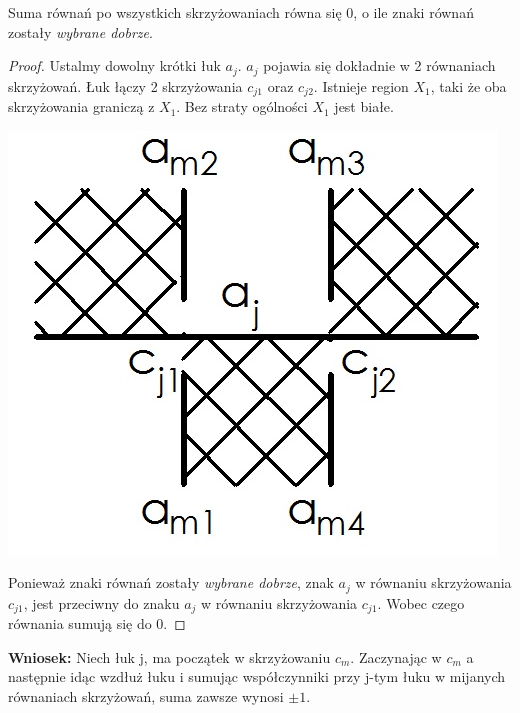 \begin{lemat}
Suma równań po wszystkich skrzyżowaniach równa się 0, o ile znaki równań zostały \emph{wybrane dobrze}.
\end{lemat}
\begin{proof}
Ustalmy dowolny krótki łuk $a_{j}$. $a_{j}$ pojawia się dokładnie w 2 równaniach skrzyżowań. Łuk łączy 2 skrzyżowania $c_{j1}$ oraz $c_{j2}$. Istnieje region $X_{1}$, taki że oba skrzyżowania graniczą z $X_{1}$. Bez straty ogólności $X_{1}$ jest białe. 
\begin{center}
  			\includegraphics[scale=0.3]{2/Obrazy/0sum}
\end{center}
Ponieważ znaki równań zostały  \emph{wybrane dobrze}, znak $a_{j}$ w równaniu skrzyżowania  
$c_{j1}$, jest przeciwny do znaku $a_{j}$ w równaniu skrzyżowania $c_{j1}$. Wobec czego równania sumują się do 0.
\end{proof}

\textbf{Wniosek:} Niech łuk j, ma początek w skrzyżowaniu $c_{m}$. Zaczynając w $c_{m}$ a następnie idąc wzdłuż łuku i sumując współczynniki przy j-tym łuku w mijanych równaniach skrzyżowań, suma zawsze wynosi $\pm 1$.

